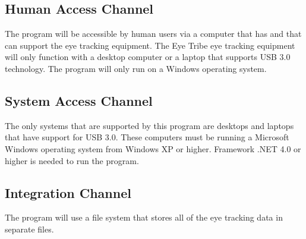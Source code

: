 

\subsection{Human Access Channel}
    The program will be accessible by human users via a computer that has and that can support the eye tracking equipment. The Eye Tribe eye tracking equipment will only function with a desktop computer or a laptop that supports USB 3.0 technology. The program will only run on a Windows operating system.
\subsection{System Access Channel}
    The only systems that are supported by this program are desktops and laptops that have support for USB 3.0. These computers must be running a Microsoft Windows operating system from Windows XP or higher. Framework .NET 4.0 or higher is needed to run the program.
\subsection{Integration Channel}
    The program will use a file system that stores all of the eye tracking data in separate files.
